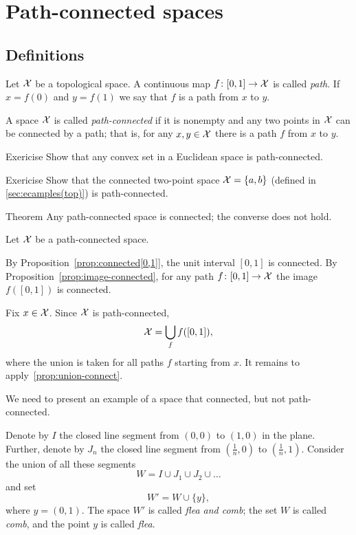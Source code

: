 \chapter{Path-connected spaces}

\section{Definitions}

Let $\mathcal{X}$ be a topological space.
A continuous map $f\colon[0,1]\to \mathcal{X}$ is called \emph{path}.
If $x=f(0)$ and $y=f(1)$ we say that $f$ is a path from $x$ to $y$.

A space $\mathcal{X}$ is called \emph{path-connected} if it is nonempty and any two points in $\mathcal{X}$ can be connected by a path;
that is, for any $x,y\in \mathcal{X}$ there is a path $f$ from $x$ to $y$.

\begin{thm}{Exericise}\label{ex:convex-path-connected}
Show that any convex set in a Euclidean space is path-connected. 
\end{thm}

\begin{thm}{Exericise}\label{ex:two-point-path-connected}
Show that the connected two-point space $\mathcal{X}=\{a,b\}$ (defined in \ref{sec:ecamples(top)}) is path-connected. 
\end{thm}

\begin{thm}{Theorem}\label{thm:conncted/path-connected}
Any path-connected space is connected;
the converse does not hold.
\end{thm}

Let $\mathcal{X}$ be a path-connected space.

By Proposition~\ref{prop:connected[0,1]}, the unit interval $[0,1]$ is connected.
By Proposition~\ref{prop:image-connected}, for any path $f\colon[0,1]\to \mathcal{X}$ the image $f([0,1])$ is connected.

Fix $x\in \mathcal{X}$. 
Since $\mathcal{X}$ is path-connected, 
\[\mathcal{X}=\bigcup_f f([0,1]),\]
where the union is taken for all paths $f$ starting from $x$.
It remains to apply~\ref{prop:union-connect}.

We need to present an example of a space that connected, but not path-connected.

Denote by $I$ the closed line segment from $(0,0)$ to $(1,0)$ in the plane.
Further, denote by $J_n$ the closed line segment from $(\tfrac1n,0)$ to $(\tfrac1n,1)$.
Consider the union of all these segments
\[W=I\cup J_1\cup J_2 \cup \dots\]
and set 
\[W'=W\cup\{y\},\]
where $y=(0,1)$.
The space $W'$ is called {}\emph{flea and comb};
the set $W$ is called \emph{comb},
and the point $y$ is called \emph{flea}.


